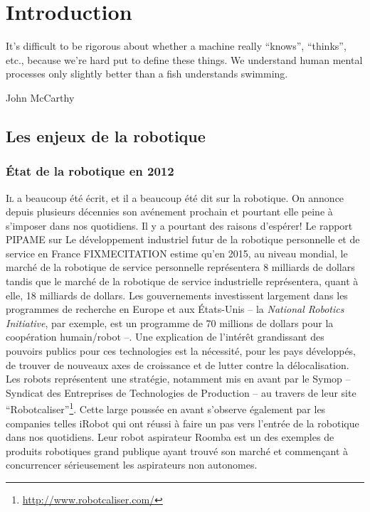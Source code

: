 \chapter{Introduction}\label{chap:chap0}

\epigraph{It's difficult to be rigorous about whether a machine really
  ``knows'', ``thinks'', etc., because we're hard put to define these
  things. We understand human mental processes only slightly better
  than a fish understands swimming.}{John McCarthy}
\clearpage

\section{Les enjeux de la robotique}

\subsection{État de la robotique en 2012}

\lettrine[lines=2, lraise=0.1, nindent=0em, slope=-.5em]%
{I}{l} a beaucoup été écrit, et il a beaucoup été dit sur la
robotique. On annonce depuis plusieurs décennies son avénement
prochain et pourtant elle peine à s'imposer dans nos quotidiens.  Il y
a pourtant des raisons d'espérer! Le rapport PIPAME sur Le
développement industriel futur de la robotique personnelle et de
service en France FIXMECITATION estime qu'en 2015, au niveau mondial,
le marché de la robotique de service personnelle représentera 8
milliards de dollars tandis que le marché de la robotique de service
industrielle représentera, quant à elle, 18 milliards de dollars. Les
gouvernements investissent largement dans les programmes de recherche
en Europe et aux États-Unis -- la \emph{National Robotics Initiative},
par exemple, est un programme de 70 millions de dollars pour la
coopération humain/robot --. Une explication de l'intérêt grandissant
des pouvoirs publics pour ces technologies est la nécessité, pour les
pays développés, de trouver de nouveaux axes de croissance et de
lutter contre la délocalisation. Les robots représentent une
stratégie, notamment mis en avant par le Symop -- Syndicat des
Entreprises de Technologies de Production -- au travers de leur site
``Robotcaliser''\footnote{\url{http://www.robotcaliser.com/}}. Cette
large poussée en avant s'observe également par les companies telles
iRobot qui ont réussi à faire un pas vers l'entrée de la robotique
dans nos quotidiens. Leur robot aspirateur Roomba est un des exemples
de produits robotiques grand publique ayant trouvé son marché et
commençant à concurrencer sérieusement les aspirateurs non autonomes.


